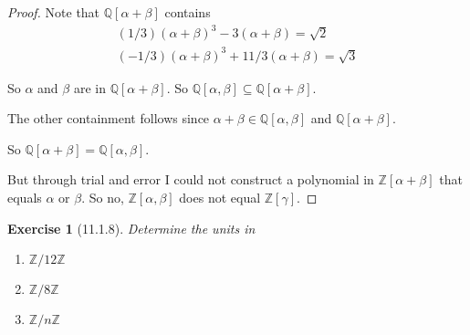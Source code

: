 \documentclass[12pt]{article}
\newtheorem*{exer}{Exercise}
\begin{document}
\begin{proof}
    
    Note that $\mathbb{Q}[\alpha + \beta]$ contains 
    \begin{align*}
        (1/3)(\alpha + \beta)^3 - 3(\alpha + \beta) = \sqrt{2} \\
        (-1/3)(\alpha + \beta)^3 + 11/3(\alpha + \beta) = \sqrt{3}
    \end{align*}

    So $\alpha$ and $\beta$ are in $\mathbb{Q}[\alpha + \beta]$. So
    $\mathbb{Q}[\alpha, \beta] \subseteq \mathbb{Q}[\alpha + \beta]$.

    The other containment follows since $\alpha + \beta \in
    \mathbb{Q}[\alpha, \beta]$ and $\mathbb{Q}[\alpha + \beta]$.

    So $\mathbb{Q}[\alpha + \beta] = \mathbb{Q}[\alpha, \beta]$.
    

    But through trial and error I could not construct a polynomial in
    $\mathbb{Z}[\alpha + \beta]$ that equals $\alpha$ or $\beta$. So no,
    $\mathbb{Z}[\alpha, \beta]$ does not equal $\mathbb{Z}[\gamma]$.

\end{proof}


\begin{exer}[11.1.8]

    Determine the units in

    \begin{enumerate}
        \item $\mathbb{Z}/12\mathbb{Z}$
        \item $\mathbb{Z}/8\mathbb{Z}$
        \item $\mathbb{Z}/n\mathbb{Z}$
    \end{enumerate}

\end{exer}
\end{document}
